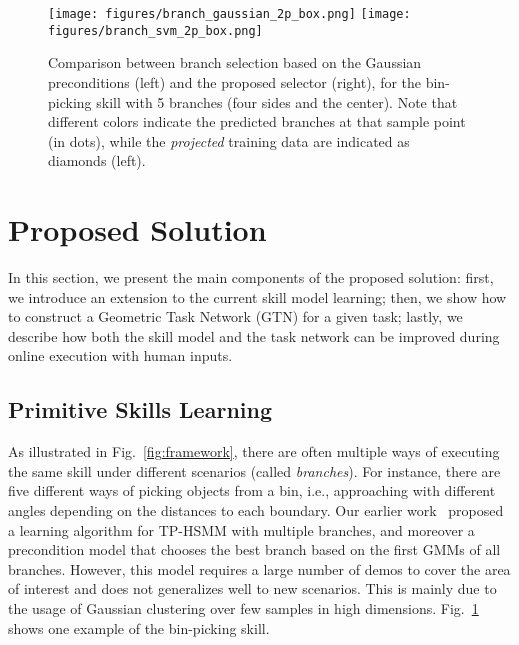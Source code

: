 \begin{figure}[t!]
    \centering
    \texttt{[image: figures/branch\_gaussian\_2p\_box.png]}
    \texttt{[image: figures/branch\_svm\_2p\_box.png]}
    \caption{
Comparison between branch selection based on the Gaussian preconditions (left) 
and the proposed selector (right), 
    for the bin-picking skill with 5 branches (four sides and the center). 
    Note that different colors indicate the predicted branches at that sample point (in dots),
 while the \emph{projected} training data are indicated as diamonds (left).}
    \label{fig:branch_compare}
    \vspace{-0.15cm}
\end{figure}

\section{Proposed Solution}\label{sec:solution}
In this section, we present the main components of the proposed solution:
first, we introduce an extension to the current skill model learning;
then, we show how to construct a Geometric Task Network (GTN) for a given task; 
lastly, we describe how both the skill model and the task network can be improved during online execution with human inputs.

\subsection{Primitive Skills Learning}\label{subsec:learn-primitive}

As illustrated in Fig.~\ref{fig:framework}, 
there are often multiple ways of executing the same skill under different scenarios (called \emph{branches}).
For instance, there are five different ways of picking objects from a bin, i.e., approaching with different angles depending on the distances to each boundary.  
Our earlier work~\cite{rozo2020learning} proposed a learning algorithm for TP-HSMM with multiple branches, 
and moreover a precondition model that chooses the best branch based on the first GMMs of all branches.
However, this model requires a large number of demos to cover the area of interest 
and does not generalizes well to new scenarios.
This is mainly due to the usage of Gaussian clustering over few samples in high dimensions. 
Fig.~\ref{fig:branch_compare} shows one example of the bin-picking skill.

